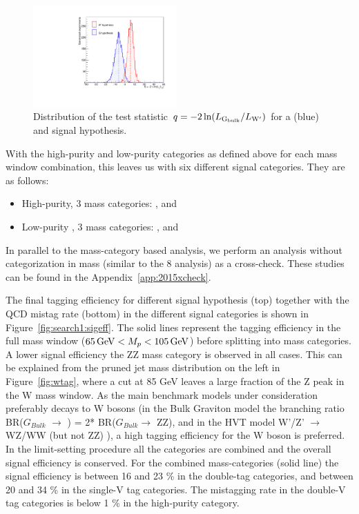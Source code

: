 \begin{figure}[h!p]
 \centering
 \includegraphics[width=0.49\textwidth]{figures/analysis/search1/AN-15-196/massCategories/sig_sep.pdf}
 \caption{Distribution of the test statistic  $q = -2 \ln(L_{\mathrm{G}_\mathrm{bulk}}/L_{\mathrm{W}^\prime})$ for a \BulkG (blue) and \PWpr signal hypothesis.}
 \label{fig:searchI:signalsep}
 \end{figure}
 
 
With the high-purity and low-purity categories as defined above for each mass window combination, this leaves us with six different signal categories. They are as follows:
\begin{itemize}
\item High-purity, 3 mass categories: \WW, \ZZ and \WZ
\item Low-purity , 3 mass categories: \WW, \ZZ and \WZ
\end{itemize}
In parallel to the mass-category based analysis, we perform an analysis without categorization in mass (similar to the 8 \TeV analysis) as a cross-check. These studies can be found in the Appendix~\ref{app:2015xcheck}.

The final tagging efficiency for different signal hypothesis (top) together with the QCD mistag rate (bottom) in the different signal categories is shown in Figure~\ref{fig:search1:sigeff}. The solid lines represent the tagging efficiency in the full mass window ($65 {\,\text{Ge\hspace{-.08em}V}} < M_{p} < 105 {\,\text{Ge\hspace{-.08em}V}}$) before splitting into mass categories. A lower signal efficiency the ZZ mass category is observed in all cases. This can be explained from the pruned jet mass distribution on the left in Figure~\ref{fig:wtag}, where a cut at 85 GeV leaves a large fraction of the Z peak in the W mass window. As the main benchmark models under consideration preferably decays to W bosons (in the Bulk Graviton model the branching ratio BR($G_{Bulk}$ $\rightarrow$ \PW\PW) = 2* BR($G_{Bulk}$$\rightarrow$ ZZ), and in the HVT model W'/Z' $\rightarrow$ WZ/WW (but not ZZ) ), a high tagging efficiency for the W boson is preferred. In the limit-setting procedure all the categories are combined and the overall signal efficiency is conserved. For the combined mass-categories (solid line) the signal efficiency is between 16 and 23 \% in the double-tag categories, and between 20 and 34 \% in the single-V tag categories. The mistagging rate in the double-V tag categories is below 1 \% in the high-purity category.

